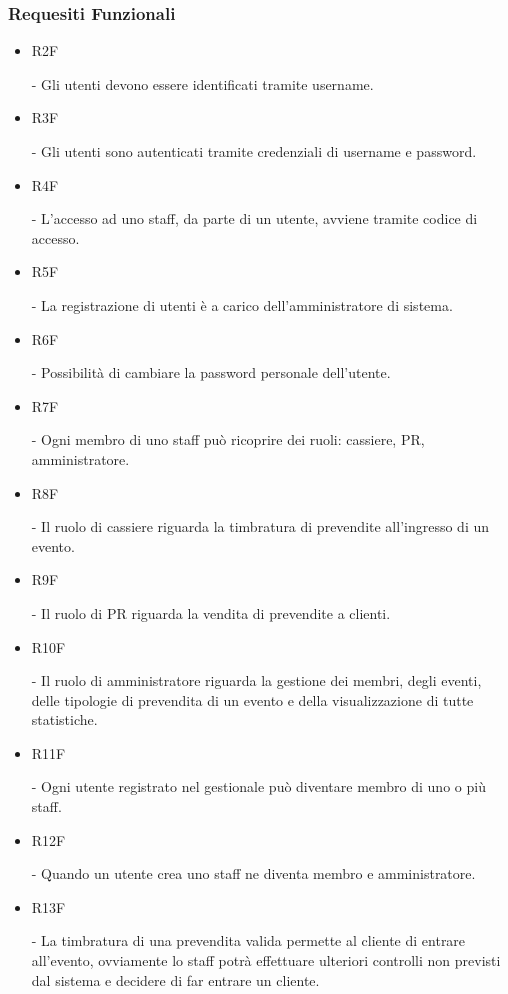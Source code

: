 \documentclass[a4paper]{article}
\begin{document}
\subsubsection{Requesiti Funzionali}

\begin{itemize}
	
	\item \hypertarget{R2F}{R2F} - Gli utenti devono essere identificati tramite username.
	
	\item \hypertarget{R3F}{R3F} - Gli utenti sono autenticati tramite credenziali di username e password.
	\item \hypertarget{R4F}{R4F} - L'accesso ad uno staff, da parte di un utente, avviene tramite codice di accesso.	

	\item \hypertarget{R5F}{R5F} - La registrazione di utenti è a carico dell'amministratore di sistema.
	\item \hypertarget{R6F}{R6F} - Possibilità di cambiare la password personale dell'utente.
		
	\item \hypertarget{R7F}{R7F} - Ogni membro di uno staff può ricoprire dei ruoli: cassiere, PR, amministratore.	
	\item \hypertarget{R8F}{R8F} - Il ruolo di cassiere riguarda la timbratura di prevendite all'ingresso di un evento.
	\item \hypertarget{R9F}{R9F} - Il ruolo di PR riguarda la vendita di prevendite a clienti.
	\item \hypertarget{R10F}{R10F} - Il ruolo di amministratore riguarda la gestione dei membri, degli eventi, delle tipologie di prevendita di un evento e della visualizzazione di tutte statistiche.
	
	\item \hypertarget{R11F}{R11F} - Ogni utente registrato nel gestionale può diventare membro di uno o più staff. 
	
	\item \hypertarget{R12F}{R12F} - Quando un utente crea uno staff ne diventa membro e amministratore.
	
	\item \hypertarget{R13F}{R13F} - La timbratura di una prevendita valida permette al cliente di entrare all'evento, ovviamente lo staff potrà effettuare ulteriori controlli non previsti dal sistema e decidere di far entrare un cliente.
	

\end{itemize}
\end{document}
